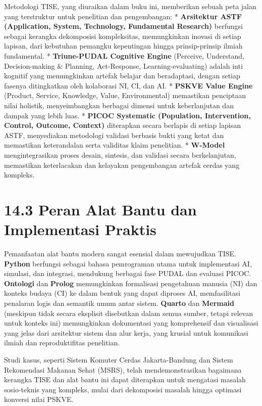 \documentclass[
  letterpaper,
  DIV=11,
  numbers=noendperiod]{scrreprt}
\begin{document}
Metodologi TISE, yang diuraikan dalam buku ini, memberikan sebuah peta
jalan yang terstruktur untuk penelitian dan pengembangan: *
\textbf{Arsitektur ASTF (Application, System, Technology, Fundamental
Research)} berfungsi sebagai kerangka dekomposisi kompleksitas,
memungkinkan inovasi di setiap lapisan, dari kebutuhan pemangku
kepentingan hingga prinsip-prinsip ilmiah fundamental. *
\textbf{Triune-PUDAL Cognitive Engine} (Perceive, Understand,
Decision-making \& Planning, Act-Response, Learning-evaluating) adalah
inti kognitif yang memungkinkan artefak belajar dan beradaptasi, dengan
setiap fasenya ditingkatkan oleh kolaborasi NI, CI, dan AI. *
\textbf{PSKVE Value Engine} (Product, Service, Knowledge, Value,
Environmental) memastikan penciptaan nilai holistik, menyeimbangkan
berbagai dimensi untuk keberlanjutan dan dampak yang lebih luas. *
\textbf{PICOC Systematic (Population, Intervention, Control, Outcome,
Context)} diterapkan secara berlapis di setiap lapisan ASTF, menyediakan
metodologi validasi berbasis bukti yang ketat dan memastikan
keterandalan serta validitas klaim penelitian. * \textbf{W-Model}
mengintegrasikan proses desain, sintesis, dan validasi secara
berkelanjutan, memastikan keterlacakan dan kelayakan pengembangan
artefak cerdas yang kompleks.

\section{\texorpdfstring{\textbf{14.3 Peran Alat Bantu dan Implementasi
Praktis}}{14.3 Peran Alat Bantu dan Implementasi Praktis}}\label{peran-alat-bantu-dan-implementasi-praktis}

Pemanfaatan alat bantu modern sangat esensial dalam mewujudkan TISE.
\textbf{Python} berfungsi sebagai bahasa pemrograman utama untuk
implementasi AI, simulasi, dan integrasi, mendukung berbagai fase PUDAL
dan evaluasi PICOC. \textbf{Ontologi} dan \textbf{Prolog} memungkinkan
formalisasi pengetahuan manusia (NI) dan konteks budaya (CI) ke dalam
bentuk yang dapat diproses AI, memfasilitasi penalaran logis dan
semantik umum antar sistem. \textbf{Quarto} dan \textbf{Mermaid}
(meskipun tidak secara eksplisit disebutkan dalam semua sumber, tetapi
relevan untuk konteks ini) memungkinkan dokumentasi yang komprehensif
dan visualisasi yang jelas dari arsitektur sistem dan alur kerja, yang
krusial untuk komunikasi ilmiah dan reproduktifitas penelitian.

Studi kasus, seperti Sistem Komuter Cerdas Jakarta-Bandung dan Sistem
Rekomendasi Makanan Sehat (MSRS), telah mendemonstrasikan bagaimana
kerangka TISE dan alat bantu ini dapat diterapkan untuk mengatasi
masalah sosio-teknis yang kompleks, mulai dari dekomposisi masalah
hingga optimasi konversi nilai PSKVE.
\end{document}
